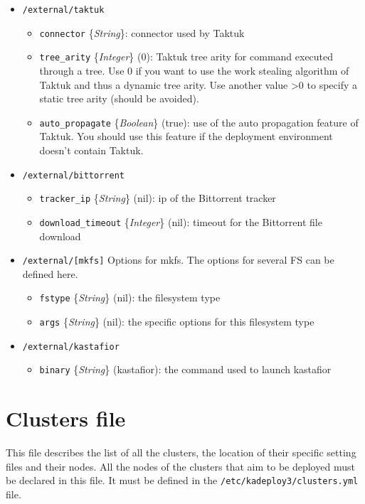 \documentclass[a4wide,10pt,oneside]{book}
\newcommand{\ypath}[1]{\texttt{#1}}
\newcommand{\yfield}[2]{\texttt{#1} {\small\{{\emph{#2}}\}}:}
\newcommand{\yfieldd}[3]{\texttt{#1} {\small\{{\emph{#2}}\}} {\small(}#3{\small)}:}
\begin{document}
\begin{itemize}
  \item \ypath{/external/taktuk}
  \begin{itemize}
    \item \yfield{connector}{String} connector used by Taktuk
    \item \yfieldd{tree\_arity}{Integer}{0} Taktuk tree arity for command executed through a tree. Use 0 if you want to use the work stealing algorithm of Taktuk and thus a dynamic tree arity. Use another value >0 to specify a static tree arity (should be avoided).
    \item \yfieldd{auto\_propagate}{Boolean}{true} use of the auto propagation feature of Taktuk. You should use this feature if the deployment environment doesn't contain Taktuk.
  \end{itemize}

  \item \ypath{/external/bittorrent}
  \begin{itemize}
    \item \yfieldd{tracker\_ip}{String}{nil} ip of the Bittorrent tracker
    \item \yfieldd{download\_timeout}{Integer}{nil} timeout for the Bittorrent file download
  \end{itemize}

  \item \ypath{/external/[mkfs]} Options for mkfs. The options for several FS can be defined here.
  \begin{itemize}
    \item \yfieldd{fstype}{String}{nil} the filesystem type
    \item \yfieldd{args}{String}{nil} the specific options for this filesystem type
  \end{itemize}

  \item \ypath{/external/kastafior}
  \begin{itemize}
    \item \yfieldd{binary}{String}{kastafior} the command used to launch kastafior
  \end{itemize}
\end{itemize}


\section{Clusters file}
This file describes the list of all the clusters, the location of their specific setting files and their nodes. All the nodes of the clusters that aim to be deployed must be declared in this file. It must be defined in the  \texttt{/etc/kadeploy3/clusters.yml} file.
\end{document}
